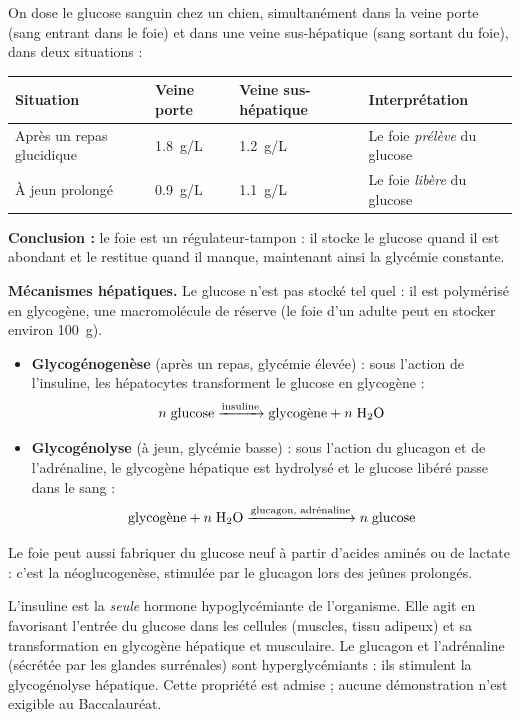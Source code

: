 \documentclass[11pt]{article}
\newcommand{\cle}[1]{{\popxbold\color{popdark}#1}}
\begin{document}
\begin{experience}
On dose le glucose sanguin chez un chien, simultanément dans la veine porte (sang entrant dans le foie) et dans une veine sus-hépatique (sang sortant du foie), dans deux situations :

\begin{center}
\begin{tabularx}{\linewidth}{|l|X|X|X|}
\hline
\rowcolor{popblueL} \textbf{Situation} & \textbf{Veine porte} & \textbf{Veine sus-hépatique} & \textbf{Interprétation} \\
\hline
Après un repas glucidique & \SI{1,8}{g/L} & \SI{1,2}{g/L} & Le foie \emph{prélève} du glucose \\
\hline
À jeun prolongé & \SI{0,9}{g/L} & \SI{1,1}{g/L} & Le foie \emph{libère} du glucose \\
\hline
\end{tabularx}
\end{center}

\textbf{Conclusion :} le foie est un \cle{régulateur-tampon} : il stocke le glucose quand il est abondant et le restitue quand il manque, maintenant ainsi la glycémie constante.
\end{experience}

\textbf{Mécanismes hépatiques.} Le glucose n'est pas stocké tel quel : il est polymérisé en \cle{glycogène}, une macromolécule de réserve (le foie d'un adulte peut en stocker environ \SI{100}{g}).

\begin{itemize}
\item \textbf{Glycogénogenèse} (après un repas, glycémie élevée) : sous l'action de l'\cle{insuline}, les hépatocytes transforment le glucose en glycogène :
\[ n\;\text{glucose} \xrightarrow{\text{insuline}} \text{glycogène} + n\;\ce{H2O} \]
\item \textbf{Glycogénolyse} (à jeun, glycémie basse) : sous l'action du \cle{glucagon} et de l'\cle{adrénaline}, le glycogène hépatique est hydrolysé et le glucose libéré passe dans le sang :
\[ \text{glycogène} + n\;\ce{H2O} \xrightarrow{\text{glucagon, adrénaline}} n\;\text{glucose} \]
\end{itemize}

Le foie peut aussi fabriquer du glucose neuf à partir d'acides aminés ou de lactate : c'est la \cle{néoglucogenèse}, stimulée par le glucagon lors des jeûnes prolongés.

\begin{propriete}
L'\cle{insuline} est la \emph{seule} hormone hypoglycémiante de l'organisme. Elle agit en favorisant l'entrée du glucose dans les cellules (muscles, tissu adipeux) et sa transformation en glycogène hépatique et musculaire. Le \cle{glucagon} et l'\cle{adrénaline} (sécrétée par les glandes surrénales) sont hyperglycémiants : ils stimulent la glycogénolyse hépatique. Cette propriété est admise ; aucune démonstration n'est exigible au Baccalauréat.
\end{propriete}
\end{document}
